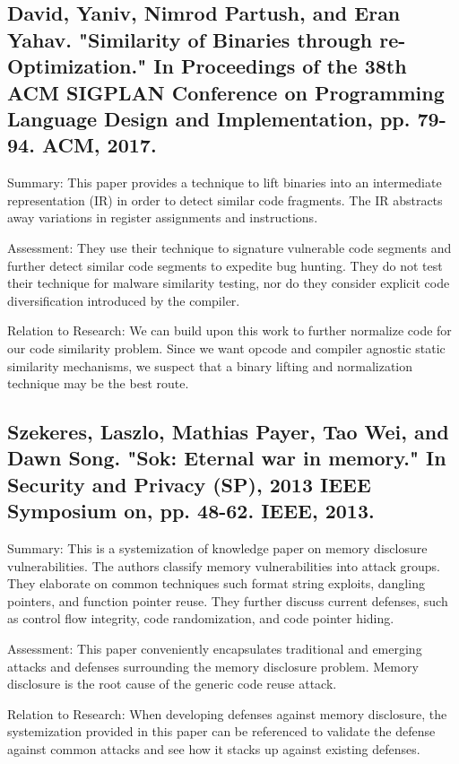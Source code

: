 \documentclass[preprint,12pt]{elsarticle}
\begin{document}
\subsection{
\cite{david2017similarity} David, Yaniv, Nimrod Partush, and Eran Yahav. "Similarity of Binaries through re-Optimization." In Proceedings of the 38th ACM SIGPLAN Conference on Programming Language Design and Implementation, pp. 79-94. ACM, 2017.
}

Summary: This paper provides a technique to lift binaries into an intermediate representation (IR) in order to detect similar code fragments. The IR abstracts away variations in register assignments and instructions.

Assessment: They use their technique to signature vulnerable code segments and further detect similar code segments to expedite bug hunting. They do not test their technique for malware similarity testing, nor do they consider explicit code diversification introduced by the compiler.

Relation to Research: We can build upon this work to further normalize code for our code similarity problem. Since we want opcode and compiler agnostic static similarity mechanisms, we suspect that a binary lifting and normalization technique may be the best route.

\subsection{
\cite{szekeres2013sok} Szekeres, Laszlo, Mathias Payer, Tao Wei, and Dawn Song. "Sok: Eternal war in memory." In Security and Privacy (SP), 2013 IEEE Symposium on, pp. 48-62. IEEE, 2013.
}

Summary: This is a systemization of knowledge paper on memory disclosure vulnerabilities. The authors classify memory vulnerabilities into attack groups. They elaborate on common techniques such format string exploits, dangling pointers, and function pointer reuse. They further discuss current defenses, such as control flow integrity, code randomization, and code pointer hiding.

Assessment: This paper conveniently encapsulates traditional and emerging attacks and defenses surrounding the memory disclosure problem. Memory disclosure is the root cause of the generic code reuse attack. 

Relation to Research: When developing defenses against memory disclosure, the systemization provided in this paper can be referenced to validate the defense against common attacks and see how it stacks up against existing defenses. 
\end{document}
